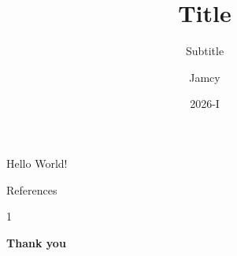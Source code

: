 \documentclass[aspectratio=169]{beamer}
\title{Title}
\subtitle{Subtitle}
\author{Jamcy}
\institute{UTEC}
\date{2026-I}
\begin{document}

\begin{frame}{Hello World!}
\end{frame}

\begin{frame}[allowframebreaks]{References}
    \footnotesize
    \begin{thebibliography}{1}
    \end{thebibliography}
\end{frame}




\begin{frame}[plain]
    \centering
    \vspace{2cm}
    {\color{white}\Huge\bfseries Thank you\par}
    \vspace{0.8em}
\end{frame}
\end{document}
